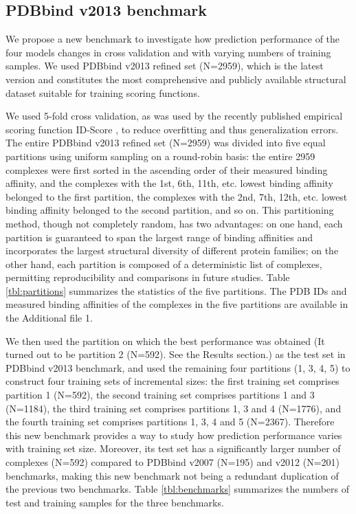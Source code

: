 \documentclass[linenumbers]{bmcart}
\begin{document}
\subsection*{PDBbind v2013 benchmark}

We propose a new benchmark to investigate how prediction performance of the four models changes in cross validation and with varying numbers of training samples. We used PDBbind v2013 refined set (N=2959), which is the latest version and constitutes the most comprehensive and publicly available structural dataset suitable for training scoring functions.

We used 5-fold cross validation, as was used by the recently published empirical scoring function ID-Score \cite{1305}, to reduce overfitting and thus generalization errors. The entire PDBbind v2013 refined set (N=2959) was divided into five equal partitions using uniform sampling on a round-robin basis: the entire 2959 complexes were first sorted in the ascending order of their measured binding affinity, and the complexes with the 1st, 6th, 11th, etc. lowest binding affinity belonged to the first partition, the complexes with the 2nd, 7th, 12th, etc. lowest binding affinity belonged to the second partition, and so on. This partitioning method, though not completely random, has two advantages: on one hand, each partition is guaranteed to span the largest range of binding affinities and incorporates the largest structural diversity of different protein families; on the other hand, each partition is composed of a deterministic list of complexes, permitting reproducibility and comparisons in future studies. Table \ref{tbl:partitions} summarizes the statistics of the five partitions. The PDB IDs and measured binding affinities of the complexes in the five partitions are available in the Additional file 1.

We then used the partition on which the best performance was obtained (It turned out to be partition 2 (N=592). See the Results section.) as the test set in PDBbind v2013 benchmark, and used the remaining four partitions (1, 3, 4, 5) to construct four training sets of incremental sizes: the first training set comprises partition 1 (N=592), the second training set comprises partitions 1 and 3 (N=1184), the third training set comprises partitions 1, 3 and 4 (N=1776), and the fourth training set comprises partitions 1, 3, 4 and 5 (N=2367). Therefore this new benchmark provides a way to study how prediction performance varies with training set size. Moreover, its test set has a significantly larger number of complexes (N=592) compared to PDBbind v2007 (N=195) and v2012 (N=201) benchmarks, making this new benchmark not being a redundant duplication of the previous two benchmarks. Table \ref{tbl:benchmarks} summarizes the numbers of test and training samples for the three benchmarks.
\end{document}
